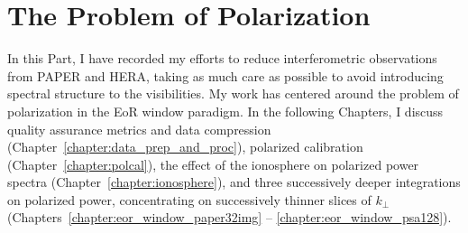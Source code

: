 \section{The Problem of Polarization}
\label{sec:eor_window_problem_of_pol}


In this Part, I have recorded my efforts to reduce interferometric observations from PAPER and HERA, taking as much care as possible to avoid introducing spectral structure to the visibilities. My work has centered around the problem of polarization in the EoR window paradigm. In the following Chapters, I discuss quality assurance metrics and data compression (Chapter~\ref{chapter:data_prep_and_proc}), polarized calibration (Chapter~\ref{chapter:polcal}), the effect of the ionosphere on polarized power spectra (Chapter~\ref{chapter:ionosphere}), and three successively deeper integrations on polarized power, concentrating on successively thinner slices of $k_{\perp}$ (Chapters~\ref{chapter:eor_window_paper32img} -- \ref{chapter:eor_window_psa128}).